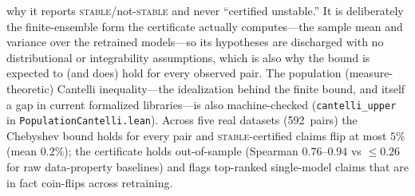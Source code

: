 \documentclass[11pt,a4paper]{article}
\begin{document}
why it reports \textsc{stable}/not-\textsc{stable} and never ``certified unstable.''  It
is deliberately the finite-ensemble form the certificate actually computes---the sample mean and
variance over the retrained models---so its hypotheses are discharged with no distributional or
integrability assumptions, which is also why the bound is expected to (and does) hold for every
observed pair.  The population (measure-theoretic) Cantelli inequality---the idealization behind the
finite bound, and itself a gap in current formalized libraries---is also machine-checked
(\texttt{cantelli\_upper} in \texttt{PopulationCantelli.lean}).  Across five real datasets (592~pairs) the Chebyshev bound holds for every pair and
\textsc{stable}-certified claims flip at most $5\%$ (mean $0.2\%$); the certificate holds
out-of-sample (Spearman $0.76$--$0.94$ vs $\leq 0.26$ for raw data-property baselines) and flags
top-ranked single-model claims that are in fact coin-flips across retraining.
\end{document}
